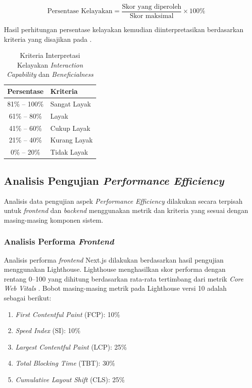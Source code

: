 \begin{equation}
	\text{Persentase Kelayakan} = \frac{\text{Skor yang diperoleh}}{\text{Skor maksimal}} \times 100\%
	\label{eq:interaction_capability_satisfaction}
\end{equation}

Hasil perhitungan persentase kelayakan kemudian diinterpretasikan berdasarkan kriteria yang disajikan pada .

\begin{table}[H]
	\centering
	\caption{Kriteria Interpretasi Kelayakan \textit{Interaction Capability} dan \textit{Beneficialness}}
	\label{tab:kriteria_interaction_capability_satisfaction}
	\begin{tabular}{|c|l|}
		\hline
		\textbf{Persentase} & \textbf{Kriteria} \\
		\hline
		81\% -- 100\%       & Sangat Layak      \\
		\hline
		61\% -- 80\%        & Layak             \\
		\hline
		41\% -- 60\%        & Cukup Layak       \\
		\hline
		21\% -- 40\%        & Kurang Layak      \\
		\hline
		0\% -- 20\%         & Tidak Layak       \\
		\hline
	\end{tabular}
\end{table}

\subsection{Analisis Pengujian \textit{Performance Efficiency}}

Analisis data pengujian aspek \textit{Performance Efficiency} dilakukan secara terpisah untuk \textit{frontend} dan \textit{backend} menggunakan metrik dan kriteria yang sesuai dengan masing-masing komponen sistem.

\subsubsection{Analisis Performa \textit{Frontend}}

Analisis performa \textit{frontend} Next.js dilakukan berdasarkan hasil pengujian menggunakan Lighthouse. Lighthouse menghasilkan skor performa dengan rentang 0--100 yang dihitung berdasarkan rata-rata tertimbang dari metrik \textit{Core Web Vitals} \citep{Google_2026_Lighthouse}. Bobot masing-masing metrik pada Lighthouse versi 10 adalah sebagai berikut:
\begin{enumerate}[label=\alph*.]
	\item \textit{First Contentful Paint} (FCP): 10\%
	\item \textit{Speed Index} (SI): 10\%
	\item \textit{Largest Contentful Paint} (LCP): 25\%
	\item \textit{Total Blocking Time} (TBT): 30\%
	\item \textit{Cumulative Layout Shift} (CLS): 25\%
\end{enumerate}

